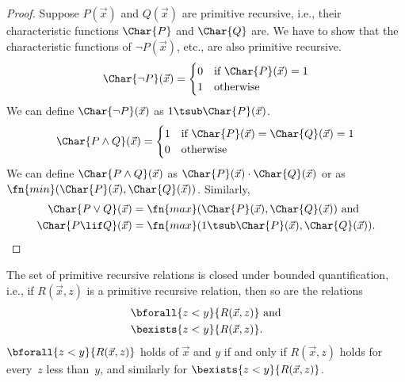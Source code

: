 \documentclass[../../../include/open-logic-section]{subfiles}
\begin{document}
\begin{proof}
  Suppose $P(\vec x)$ and $Q(\vec x)$ are primitive recursive, i.e.,
  their characteristic functions $\Char{P}$ and $\Char{Q}$ are.  We
  have to show that the characteristic functions of $\lnot P(\vec x)$,
  etc., are also primitive recursive.
  \[
  \Char{\lnot P}(\vec x) = \begin{cases}
    0 & \text{if $\Char{P}(\vec x) = 1$}\\
    1 & \text{otherwise}
  \end{cases}
  \]
  We can define $\Char{\lnot P}(\vec x)$ as $1 \tsub \Char{P}(\vec x)$.
  \[
  \Char{P \land Q}(\vec x) = \begin{cases}
    1 & \text{if $\Char{P}(\vec x) = \Char{Q}(\vec x) = 1$}\\
    0 & \text{otherwise}
  \end{cases}
  \]
  We can define $\Char{P \land Q}(\vec x)$ as $\Char{P}(\vec x) \cdot
  \Char{Q}(\vec x)$ or as $\fn{min}(\Char{P}(\vec x), \Char{Q}(\vec
  x))$. Similarly, 
  \begin{align*}
    \Char{P \lor Q}(\vec x) & = \fn{max}(\Char{P}(\vec x), \Char{Q}(\vec x)) \text{ and}\\
    \Char{P \lif Q}(\vec x) & = \fn{max}(1 \tsub
  \Char{P}(\vec x), \Char{Q}(\vec x)).
  \end{align*}
\end{proof}

\begin{prop}
  The set of primitive recursive relations is closed under bounded
  quantification, i.e., if $R(\vec x, z)$ is a primitive recursive
  relation, then so are the relations
  \begin{align*}
    & \bforall{z < y}{R(\vec x, z)} \text{ and}\\
    & \bexists{z < y}{R(\vec x, z)}.
  \end{align*}
  $\bforall{z < y}{R(\vec x, z)}$ holds of $\vec x$ and $y$ if and
  only if $R(\vec x, z)$ holds for every~$z$ less than~$y$, and
  similarly for $\bexists{z < y}{R(\vec x, z)}$.
\end{prop}
\end{document}
